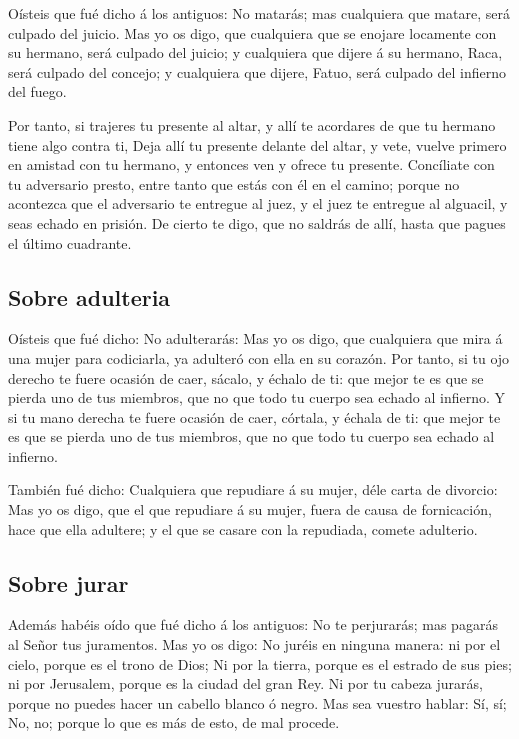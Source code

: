  Oísteis que fué dicho á los antiguos: No matarás; mas
cualquiera que matare, será culpado del juicio.  Mas yo os
digo, que cualquiera que se enojare locamente con su hermano, será
culpado del juicio; y cualquiera que dijere á su hermano, Raca, será
culpado del concejo; y cualquiera que dijere, Fatuo, será culpado del
infierno del fuego.

 Por tanto, si trajeres tu presente al altar, y allí te
acordares de que tu hermano tiene algo contra ti,  Deja
allí tu presente delante del altar, y vete, vuelve primero en amistad
con tu hermano, y entonces ven y ofrece tu presente. 
Concíliate con tu adversario presto, entre tanto que estás con él en el
camino; porque no acontezca que el adversario te entregue al juez, y el
juez te entregue al alguacil, y seas echado en prisión.  De
cierto te digo, que no saldrás de allí, hasta que pagues el último
cuadrante.

\hypertarget{sobre-adulteria}{%
\subsection{Sobre adulteria}\label{sobre-adulteria}}

 Oísteis que fué dicho: No adulterarás:  Mas
yo os digo, que cualquiera que mira á una mujer para codiciarla, ya
adulteró con ella en su corazón.  Por tanto, si tu ojo
derecho te fuere ocasión de caer, sácalo, y échalo de ti: que mejor te
es que se pierda uno de tus miembros, que no que todo tu cuerpo sea
echado al infierno.  Y si tu mano derecha te fuere ocasión
de caer, córtala, y échala de ti: que mejor te es que se pierda uno de
tus miembros, que no que todo tu cuerpo sea echado al infierno.

 También fué dicho: Cualquiera que repudiare á su mujer,
déle carta de divorcio:  Mas yo os digo, que el que
repudiare á su mujer, fuera de causa de fornicación, hace que ella
adultere; y el que se casare con la repudiada, comete adulterio.

\hypertarget{sobre-jurar}{%
\subsection{Sobre jurar}\label{sobre-jurar}}

 Además habéis oído que fué dicho á los antiguos: No te
perjurarás; mas pagarás al Señor tus juramentos.  Mas yo os
digo: No juréis en ninguna manera: ni por el cielo, porque es el trono
de Dios;  Ni por la tierra, porque es el estrado de sus
pies; ni por Jerusalem, porque es la ciudad del gran Rey. 
Ni por tu cabeza jurarás, porque no puedes hacer un cabello blanco ó
negro.  Mas sea vuestro hablar: Sí, sí; No, no; porque lo
que es más de esto, de mal procede.

